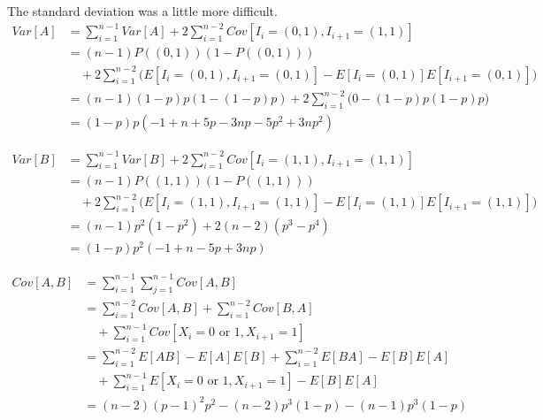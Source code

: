 \documentclass{article}
\begin{document}
The standard deviation was a little more difficult.  
    \begin{equation*}
        \begin{split}
        Var[A]& =\sum_{i=1}^{n-1}Var[A]+2\sum_{i=1}^{n-2}Cov[I_i=(0,1),I_{i+1}=
                 (1,1)] \\
              & =(n-1)P((0,1))(1-P((0,1))) \\
              & \quad +2\sum_{i=1}^{n-2}\bigg(E[I_i=(0,1),I_{i+1}=(0,1)]-E[I_i=
                (0,1)]E[I_{i+1}=(0,1)]\bigg) \\
              & =(n-1)(1-p)p(1-(1-p)p)+2\sum_{i=1}^{n-2}\bigg(0-(1-p)p(1-p)p
                \bigg) \\
              & =(1-p)p(-1+n+5p-3np-5p^2+3np^2)
        \end{split}
    \end{equation*}

    \begin{equation*}
        \begin{split}
        Var[B]& =\sum_{i=1}^{n-1}Var[B]+2\sum_{i=1}^{n-2}Cov[I_i=(1,1),I_{i+1}=
                (1,1)] \\
              & =(n-1)P((1, 1))(1-P((1, 1))) \\
              & \quad +2\sum_{i=1}^{n-2}\bigg(E[I_i=(1,1),I_{i+1}=(1,1)]-E[I_i=
                (1,1)]E[I_{i+1}=(1,1)]\bigg) \\
              & =(n-1)p^2(1-p^2)+2(n-2)(p^3-p^4) \\
              & =(1-p)p^2(-1+n-5p+3np)
        \end{split}
    \end{equation*}

    \begin{equation*}
        \begin{split}
        Cov[A,B]& =\sum_{i=1}^{n-1}\sum_{j=1}^{n-1}Cov[A,B] \\
                & =\sum_{i=1}^{n-2}Cov[A,B]+\sum_{i=1}^{n-2}Cov[B,A] \\
                & \quad +\sum_{i=1}^{n-1}Cov[X_i=0\text{ or }1,X_{i+1}=1] \\
                & =\sum_{i=1}^{n-2}E[AB]-E[A]E[B]+\sum_{i=1}^{n-2}E[BA]-
                  E[B]E[A] \\
                & \quad +\sum_{i=1}^{n-1}E[X_i=0\text{ or }1,X_{i+1}=1]-
                  E[B]E[A] \\
                & =(n-2)(p-1)^2p^2-(n-2)p^3(1-p)-(n-1)p^3(1-p)
        \end{split}
    \end{equation*}
	
\end{document}
